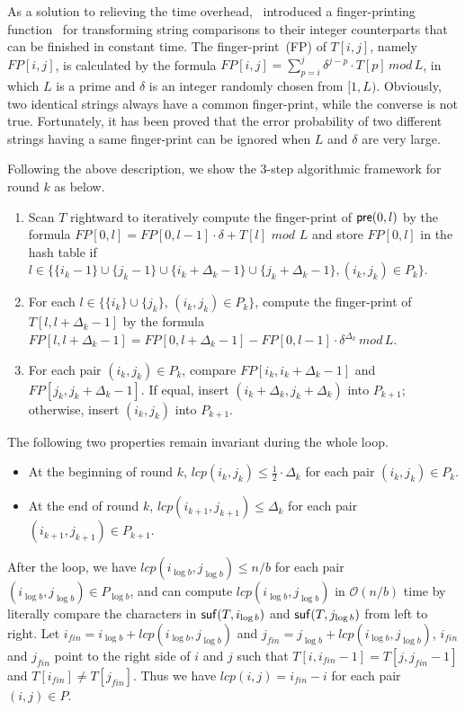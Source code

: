\documentclass{llncs}
\begin{document}
As a solution to relieving the time overhead,~\cite{Philip2013} introduced a finger-printing function~\cite{Karp1987} for transforming string comparisons to their integer counterparts that can be finished in constant time. The finger-print~(FP) of $T[i,j]$, namely $FP[i,j]$, is calculated by the formula $FP[i,j] = \sum_{p=i}^{j} \delta^{j-p} \cdot T[p] \, mod \, L$, in which $L$ is a prime and $\delta$ is an integer randomly chosen from $[1,L)$. Obviously, two identical strings always have a common finger-print, while the converse is not true. Fortunately, it has been proved that the error probability of two different strings having a same finger-print can be ignored when $L$ and $\delta$ are very large.

Following the above description, we show the 3-step algorithmic framework for round $k$ as below. 

\begin{enumerate}[S1.]
\item Scan $T$ rightward to iteratively compute the finger-print of ${\sf pre}(0,l)$ by the formula $FP[0,l] = FP[0,l-1] \cdot \delta + T[l] \,\, mod \,\, L$ and store $FP[0,l]$ in the hash table if $l\in \{ \{i_k-1\}\cup\{j_k-1\}\cup\{i_k +\Delta_{k} - 1\}\cup\{j_k+ \Delta_{k} - 1\},(i_k,j_k)\in P_k\}$.
\item For each $l\in \{\{i_k\}\cup \{j_k\}$, $(i_k,j_k)\in P_k\}$, compute the finger-print of $T[l,l+\Delta_{k} - 1]$ by the formula $FP[l,l+ \Delta_{k} - 1]=FP[0,l+ \Delta_{k} - 1] - FP[0,l-1] \cdot \delta^{\Delta_{k}} \, mod \, L$.
\item For each pair $(i_k,j_k)\in P_k$, compare $FP[i_k,i_k+\Delta_{k} - 1]$ and $FP[j_k,j_k+\Delta_{k} - 1]$. If equal, insert $(i_k+\Delta_{k},j_k+\Delta_{k})$ into $P_{k+1}$; otherwise, insert $(i_k, j_k)$ into $P_{k+1}$.
\end{enumerate}

The following two properties remain invariant during the whole loop.

\begin{itemize}
\item At the beginning of round $k$, $lcp(i_k,j_k) \le \frac{1}{2} \cdot \Delta_{k}$ for each pair $(i_k,j_k) \in P_k$.
\item At the end of round $k$, $lcp(i_{k+1},j_{k+1}) \le \Delta_{k}$ for each pair $(i_{k+1},j_{k+1}) \in P_{k+1}$.
\end{itemize}

After the loop, we have $lcp(i_{\log b},j_{\log b}) \le n/b$ for each pair $(i_{\log b},j_{\log b}) \in P_{\log b}$, and can compute $lcp(i_{\log b}, j_{\log b})$ in $\mathcal{O}(n/b)$ time by literally compare the characters in ${\sf suf}(T,i_{\log b})$ and ${\sf suf}(T,j_{\log b})$ from left to right. Let $i_{fin} = i_{\log b} + lcp(i_{\log b}, j_{\log b})$ and $j_{fin}= j_{\log b} + lcp(i_{\log b}, j_{\log b})$, $i_{fin}$ and $j_{fin}$ point to the right side of $i$ and $j$ such that $T[i,i_{fin}-1] = T[j,j_{fin}-1]$ and $T[i_{fin}] \neq T[j_{fin}]$. Thus we have $lcp(i,j) = i_{fin} - i$ for each pair $(i,j)\in P$.
\end{document}
